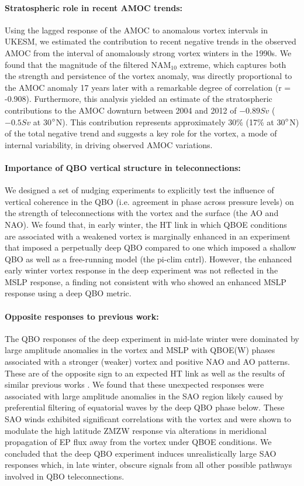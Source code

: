 \paragraph{Stratospheric role in recent AMOC trends:}
Using the lagged response of the AMOC to anomalous vortex intervals in UKESM, we estimated the contribution to recent negative trends in the observed AMOC from the interval of anomalously strong vortex winters in the 1990s. We found that the magnitude of the filtered NAM$_{10}$ extreme, which captures both the strength and persistence of the vortex anomaly, was directly proportional to the AMOC anomaly 17 years later with a remarkable degree of correlation (r = -0.908). Furthermore, this analysis yielded an estimate of the stratospheric contributions to the AMOC downturn between 2004 and 2012 of $-0.89Sv$ ($-0.5Sv$ at 30$\degree$N). This contribution represents approximately 30\% (17\% at 30$\degree$N) of the total negative trend and suggests a key role for the vortex, a mode of internal variability, in driving observed AMOC variations. 

\paragraph{Importance of QBO vertical structure in teleconnections:}
We designed a set of nudging experiments to explicitly test the influence of vertical coherence in the QBO (i.e. agreement in phase across pressure levels) on the strength of teleconnections with the vortex and the surface (the AO and NAO). We found that, in early winter, the HT link in which QBOE conditions are associated with a weakened vortex \citep{HoltonJamesRTan1980} is marginally enhanced in an experiment that imposed a perpetually deep QBO compared to one which imposed a shallow QBO as well as a free-running model (the pi-clim cntrl). However, the enhanced early winter vortex response in the deep experiment was not reflected in the MSLP response, a finding not consistent with \cite{andrewsObserved2019d} who showed an enhanced MSLP response using a deep QBO metric. 

\paragraph{Opposite responses to previous work:}
The QBO responses of the deep experiment in mid-late winter were dominated by large amplitude anomalies in the vortex and MSLP with QBOE(W) phases associated with a stronger (weaker) vortex and positive NAO and AO patterns. These are of the opposite sign to an expected HT link as well as the results of similar previous works \citep{graySurface2018b, andrewsObserved2019d}. We found that these unexpected responses were associated with large amplitude anomalies in the SAO region likely caused by preferential filtering of equatorial waves by the deep QBO phase below. These SAO winds exhibited significant correlations with the vortex and were shown to modulate the high latitude ZMZW response via alterations in meridional propagation of EP flux away from the vortex under QBOE conditions. We concluded that the deep QBO experiment induces unrealistically large SAO responses which, in late winter, obscure signals from all other possible pathways involved in QBO teleconnections. 

